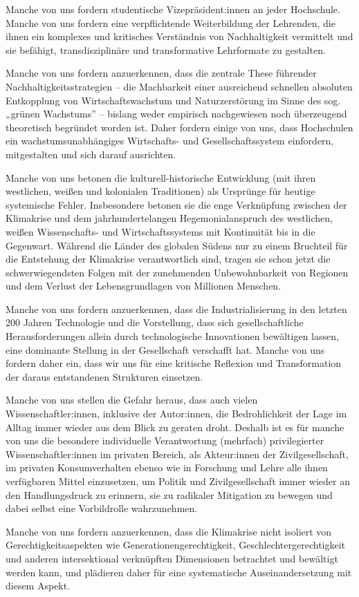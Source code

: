 \documentclass[DIV=12]{scrartcl}
\begin{document}
Manche von uns fordern studentische Vizepräsident:innen an jeder
Hochschule.
Manche von uns fordern eine verpflichtende Weiterbildung der Lehrenden,
die ihnen ein komplexes und kritisches Verständnis von Nachhaltigkeit
vermittelt und sie befähigt, transdisziplinäre und transformative
Lehrformate zu gestalten.

Manche von uns fordern anzuerkennen, dass die zentrale These führender
Nachhaltigkeitsstrategien -- die Machbarkeit einer ausreichend schnellen
absoluten Entkopplung von Wirtschaftswachstum und Naturzerstörung im
Sinne des sog. „grünen Wachstums'' -- bislang weder empirisch
nachgewiesen noch überzeugend theoretisch begründet worden ist. Daher
fordern einige von uns, dass Hochschulen ein wachstumsunabhängiges
Wirtschafts- und Gesellschaftssystem einfordern, mitgestalten und sich
darauf ausrichten.

Manche von uns betonen die kulturell-historische Entwicklung (mit ihren
westlichen, weißen und kolonialen Traditionen) als Ursprünge für heutige
systemische Fehler. Insbesondere betonen sie die enge Verknüpfung
zwischen der Klimakrise und dem jahrhundertelangen Hegemonialanspruch
des westlichen, weißen Wissenschafts- und Wirtschaftssystems mit
Kontinuität bis in die Gegenwart. Während die Länder des globalen Südens
nur zu einem Bruchteil für die Entstehung der Klimakrise verantwortlich
sind, tragen sie schon jetzt die schwerwiegendsten Folgen mit der
zunehmenden Unbewohnbarkeit von Regionen und dem Verlust der
Lebensgrundlagen von Millionen Menschen.

Manche von uns fordern anzuerkennen, dass die Industrialisierung in den
letzten 200 Jahren Technologie und die Vorstellung, dass sich
gesellschaftliche Herausforderungen allein durch technologische
Innovationen bewältigen lassen, eine dominante Stellung in der
Gesellschaft verschafft hat. Manche von uns fordern daher ein, dass wir
uns für eine kritische Reflexion und Transformation der daraus
entstandenen Strukturen einsetzen.

Manche von uns stellen die Gefahr heraus, dass auch vielen
Wissenschaftler:innen, inklusive der Autor:innen, die Bedrohlichkeit der
Lage im Alltag immer wieder aus dem Blick zu geraten droht. Deshalb ist
es für manche von uns die besondere individuelle Verantwortung
(mehrfach) privilegierter Wissenschaftler:innen im privaten Bereich, als
Akteur:innen der Zivilgesellschaft, im privaten Konsumverhalten ebenso
wie in Forschung und Lehre alle ihnen verfügbaren Mittel einzusetzen, um
Politik und Zivilgesellschaft immer wieder an den Handlungsdruck zu
erinnern, sie zu radikaler Mitigation zu bewegen und dabei selbst eine
Vorbildrolle wahrzunehmen.

Manche von uns fordern anzuerkennen, dass die Klimakrise nicht isoliert
von Gerechtigkeitsaspekten wie Generationengerechtigkeit,
Geschlechtergerechtigkeit und anderen intersektional verknüpften
Dimensionen betrachtet und bewältigt werden kann, und plädieren daher
für eine systematische Auseinandersetzung mit diesem Aspekt.
\end{document}
